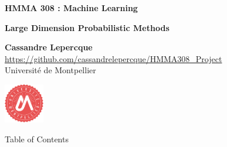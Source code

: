 \documentclass[unknownkeysallowed]{beamer}
\begin{document}

\begin{frame}
\bigskip
\bigskip
\begin{center}{
\LARGE\color{marron}
\textbf{HMMA 308 : Machine Learning}
\textbf{ }\\
\vspace{0.5cm}
}

\color{marron}
\textbf{Large Dimension Probabilistic Methods}
\end{center}

\vspace{0.5cm}

\begin{center}
\textbf{Cassandre Lepercque} \\
\vspace{0.1cm}
\url{https://github.com/cassandrelepercque/HMMA308_Project}\\
\vspace{0.5cm}
Université de Montpellier \\
\end{center}

\centering
\includegraphics[width=0.13\textwidth]{images/Logo.pdf}

\end{frame}




\begin{frame}{Table of Contents}
\tableofcontents[hideallsubsections]
\end{frame}


\end{document}
